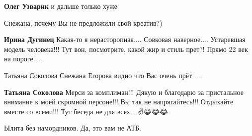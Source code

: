 \begin{itemize}
\begin{itemize}
 
\textbf{Олег Узварик} и дальше только хуже
\end{itemize}

 
Снежана, почему Вы не предложили свой креатив?)

\begin{itemize}
 
\textbf{Ирина Дугинец}
Какая-то я нерасторопная....
Совковая наверное....
Устаревшая модель человека!!!
Тут вон, посмотрите, какой жир и стиль прет?!
Прямо 22 век на пороге....

Татьяна Соколова
Снежана Егорова видно что Вас очень прёт ...


 
\textbf{Татьяна Соколова} Мерси за комплиман!!!
Дякую и благодарю за пристальное внимание к моей скромной персоне!!!
Вы так не напрягайтесь!!!
Отдыхайте вместе со всеми!!!
Тут беседа не для всех....✌️😂😂😂
\end{itemize}

 
Ылита без намордников.
Да, это вам не АТБ.

 


\end{itemize}
